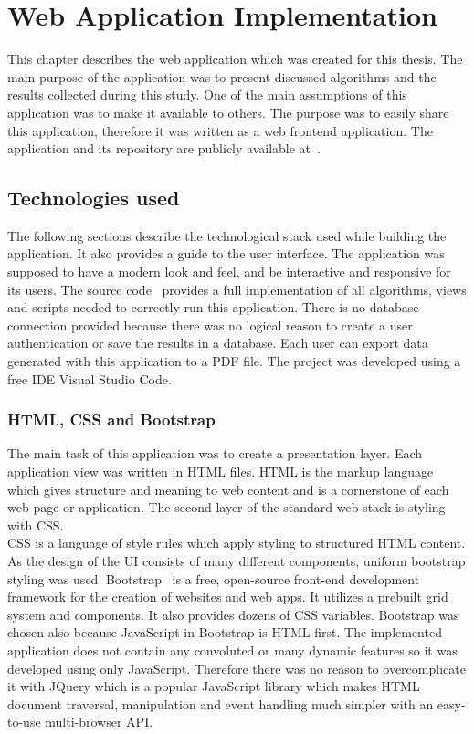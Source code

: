 \chapter{Web Application Implementation}%
This chapter describes the web application which was created for this thesis. The main purpose of the application was to present discussed algorithms
and the results collected during this study. One of the main assumptions of this application was to make it available to others. The purpose was to
easily share this application, therefore it was written as a web frontend application. The application and its repository are publicly available at~\cite{26, 27}.
\section{Technologies used}
The following sections describe the technological stack used while building the application. It also provides a guide to the user interface. The application 
was supposed to have a modern look and feel, and be interactive and responsive for its users. The source code~\cite{27} provides a full implementation of all algorithms,
views and scripts needed to correctly run this application. There is no database connection provided because there was no logical reason to create a user
authentication or save the results in a database. Each user can export data generated with this application to a PDF file. The project was developed using a free
IDE Visual Studio Code.
\subsection{HTML, CSS and Bootstrap}
The main task of this application was to create a presentation layer. Each application view was written in HTML files. HTML is the markup language which
gives structure and meaning to web content and is a cornerstone of each web page or application. The second layer of the standard web stack is styling with CSS.\\
CSS is a language of style rules which apply styling to structured HTML content. As the design of the UI consists of many different components, uniform
bootstrap styling was used. Bootstrap~\cite{28} is a free, open-source front-end development framework for the creation of websites and web apps. It utilizes a prebuilt
grid system and components. It also provides dozens of CSS variables. Bootstrap was chosen also because JavaScript in Bootstrap is HTML-first. The implemented 
application does not contain any convoluted or many dynamic features so it was developed using only JavaScript. Therefore there was no reason to overcomplicate it
with JQuery which is a popular JavaScript library which makes HTML document traversal, manipulation and event handling much simpler with an easy-to-use multi-browser API.%
